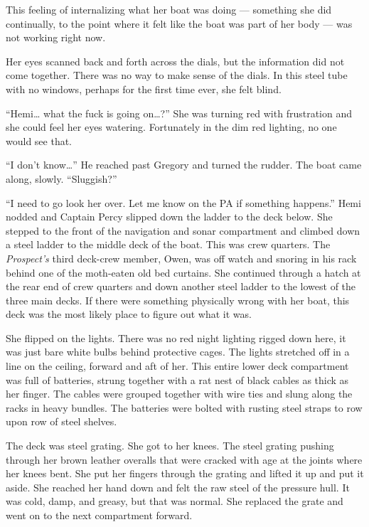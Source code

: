 \documentclass[
]{scrbook}
\begin{document}
This feeling of internalizing what her boat was doing --- something she
did continually, to the point where it felt like the boat was part of
her body --- was not working right now.

Her eyes scanned back and forth across the dials, but the information
did not come together. There was no way to make sense of the dials. In
this steel tube with no windows, perhaps for the first time ever, she
felt blind.

``Hemi\ldots{} what the fuck is going on\ldots?'' She was turning red
with frustration and she could feel her eyes watering. Fortunately in
the dim red lighting, no one would see that.

``I don't know\ldots{}'' He reached past Gregory and turned the rudder.
The boat came along, slowly. ``Sluggish?''

``I need to go look her over. Let me know on the PA if something
happens.'' Hemi nodded and Captain Percy slipped down the ladder to the
deck below. She stepped to the front of the navigation and sonar
compartment and climbed down a steel ladder to the middle deck of the
boat. This was crew quarters. The \emph{Prospect's} third deck-crew
member, Owen, was off watch and snoring in his rack behind one of the
moth-eaten old bed curtains. She continued through a hatch at the rear
end of crew quarters and down another steel ladder to the lowest of the
three main decks. If there were something physically wrong with her
boat, this deck was the most likely place to figure out what it was.

She flipped on the lights. There was no red night lighting rigged down
here, it was just bare white bulbs behind protective cages. The lights
stretched off in a line on the ceiling, forward and aft of her. This
entire lower deck compartment was full of batteries, strung together
with a rat nest of black cables as thick as her finger. The cables were
grouped together with wire ties and slung along the racks in heavy
bundles. The batteries were bolted with rusting steel straps to row upon
row of steel shelves.

The deck was steel grating. She got to her knees. The steel grating
pushing through her brown leather overalls that were cracked with age at
the joints where her knees bent. She put her fingers through the grating
and lifted it up and put it aside. She reached her hand down and felt
the raw steel of the pressure hull. It was cold, damp, and greasy, but
that was normal. She replaced the grate and went on to the next
compartment forward.
\end{document}
